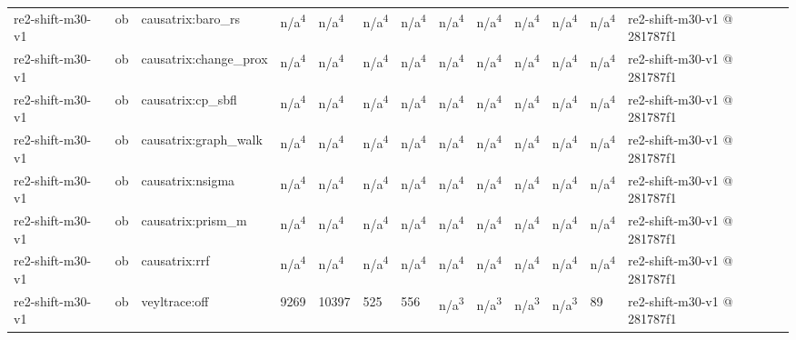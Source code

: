 \begin{table}[t]
\begin{tabular}{lllllllllllll}
re2-shift-m30-v1 & ob & causatrix:baro\_rs & n/a\textsuperscript{4} & n/a\textsuperscript{4} & n/a\textsuperscript{4} & n/a\textsuperscript{4} & n/a\textsuperscript{4} & n/a\textsuperscript{4} & n/a\textsuperscript{4} & n/a\textsuperscript{4} & n/a\textsuperscript{4} & re2-shift-m30-v1 @ 281787f1 \\
re2-shift-m30-v1 & ob & causatrix:change\_prox & n/a\textsuperscript{4} & n/a\textsuperscript{4} & n/a\textsuperscript{4} & n/a\textsuperscript{4} & n/a\textsuperscript{4} & n/a\textsuperscript{4} & n/a\textsuperscript{4} & n/a\textsuperscript{4} & n/a\textsuperscript{4} & re2-shift-m30-v1 @ 281787f1 \\
re2-shift-m30-v1 & ob & causatrix:cp\_sbfl & n/a\textsuperscript{4} & n/a\textsuperscript{4} & n/a\textsuperscript{4} & n/a\textsuperscript{4} & n/a\textsuperscript{4} & n/a\textsuperscript{4} & n/a\textsuperscript{4} & n/a\textsuperscript{4} & n/a\textsuperscript{4} & re2-shift-m30-v1 @ 281787f1 \\
re2-shift-m30-v1 & ob & causatrix:graph\_walk & n/a\textsuperscript{4} & n/a\textsuperscript{4} & n/a\textsuperscript{4} & n/a\textsuperscript{4} & n/a\textsuperscript{4} & n/a\textsuperscript{4} & n/a\textsuperscript{4} & n/a\textsuperscript{4} & n/a\textsuperscript{4} & re2-shift-m30-v1 @ 281787f1 \\
re2-shift-m30-v1 & ob & causatrix:nsigma & n/a\textsuperscript{4} & n/a\textsuperscript{4} & n/a\textsuperscript{4} & n/a\textsuperscript{4} & n/a\textsuperscript{4} & n/a\textsuperscript{4} & n/a\textsuperscript{4} & n/a\textsuperscript{4} & n/a\textsuperscript{4} & re2-shift-m30-v1 @ 281787f1 \\
re2-shift-m30-v1 & ob & causatrix:prism\_m & n/a\textsuperscript{4} & n/a\textsuperscript{4} & n/a\textsuperscript{4} & n/a\textsuperscript{4} & n/a\textsuperscript{4} & n/a\textsuperscript{4} & n/a\textsuperscript{4} & n/a\textsuperscript{4} & n/a\textsuperscript{4} & re2-shift-m30-v1 @ 281787f1 \\
re2-shift-m30-v1 & ob & causatrix:rrf & n/a\textsuperscript{4} & n/a\textsuperscript{4} & n/a\textsuperscript{4} & n/a\textsuperscript{4} & n/a\textsuperscript{4} & n/a\textsuperscript{4} & n/a\textsuperscript{4} & n/a\textsuperscript{4} & n/a\textsuperscript{4} & re2-shift-m30-v1 @ 281787f1 \\
re2-shift-m30-v1 & ob & veyltrace:off & 9269 & 10397 & 525 & 556 & n/a\textsuperscript{3} & n/a\textsuperscript{3} & n/a\textsuperscript{3} & n/a\textsuperscript{3} & 89 & re2-shift-m30-v1 @ 281787f1 \\

\end{tabular}
\end{table}
